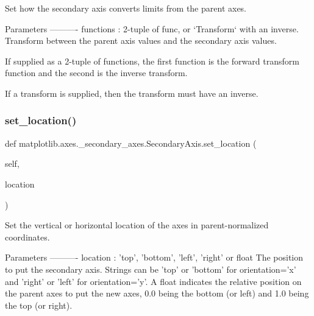 \begin{DoxyVerb}Set how the secondary axis converts limits from the parent axes.

Parameters
----------
functions : 2-tuple of func, or `Transform` with an inverse.
    Transform between the parent axis values and the secondary axis
    values.

    If supplied as a 2-tuple of functions, the first function is
    the forward transform function and the second is the inverse
    transform.

    If a transform is supplied, then the transform must have an
    inverse.
\end{DoxyVerb}
 \mbox{\label{classmatplotlib_1_1axes_1_1__secondary__axes_1_1SecondaryAxis_a01c3fe5131bcbf97a6d0bc596b45f156}} 
\subsubsection{\texorpdfstring{set\+\_\+location()}{set\_location()}}
{\footnotesize\ttfamily def matplotlib.\+axes.\+\_\+secondary\+\_\+axes.\+Secondary\+Axis.\+set\+\_\+location (\begin{DoxyParamCaption}\item[{}]{self,  }\item[{}]{location }\end{DoxyParamCaption})}

\begin{DoxyVerb}Set the vertical or horizontal location of the axes in
parent-normalized coordinates.

Parameters
----------
location : {'top', 'bottom', 'left', 'right'} or float
    The position to put the secondary axis.  Strings can be 'top' or
    'bottom' for orientation='x' and 'right' or 'left' for
    orientation='y'. A float indicates the relative position on the
    parent axes to put the new axes, 0.0 being the bottom (or left)
    and 1.0 being the top (or right).
\end{DoxyVerb}
 \mbox{\label{classmatplotlib_1_1axes_1_1__secondary__axes_1_1SecondaryAxis_ab24ced668bffde6602b58633ea89577c}} 

